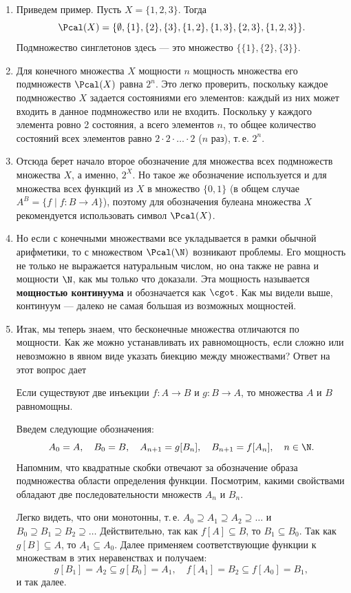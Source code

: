 \begin{enumerate}
\item Приведем пример. Пусть $X=\{1,2,3\}$. Тогда
$$
\Pcal(X) = \{\emptyset,\{1\},\{2\},\{3\},\{1,2\},\{1,3\},\{2,3\},\{1,2,3\}\}.
$$
Подмножество синглетонов здесь --- это множество $\{\{1\},\{2\},\{3\}\}$.

\item Для конечного множества $X$ мощности $n$ мощность множества его подмножеств $\Pcal(X)$ равна $2^n$. Это легко проверить, поскольку каждое подмножество $X$ задается состояниями его элементов: каждый из них может входить в данное подмножество или не входить. Поскольку у каждого элемента ровно 2 состояния, а всего элементов $n$, то общее количество состояний всех элементов равно $2\cdot 2\cdot\ldots\cdot 2$ ($n$ раз), т.\,е. $2^n$.
\item Отсюда берет начало второе обозначение для множества всех подмножеств множества $X$, а именно, $2^X$.
Но такое же обозначение используется и для множества всех функций из $X$ в множество $\{0,1\}$ (в общем случае $A^B=\{f\mid f:B\to A\}$), поэтому для обозначения булеана множества $X$ рекомендуется использовать символ $\Pcal(X)$.

\item Но если с конечными множествами все укладывается в рамки обычной арифметики, то с множеством $\Pcal(\N)$ возникают проблемы. Его мощность не только не выражается натуральным числом, но она также не равна и мощности $\N$, как мы только что доказали. Эта мощность называется \textbf{мощностью континуума} и обозначается как $\cgot$. Как мы видели выше, континуум --- далеко не самая большая из возможных мощностей.
\item Итак, мы теперь знаем, что бесконечные множества отличаются по мощности. Как же можно устанавливать их равномощность, если сложно или невозможно в явном виде указать биекцию между множествами? Ответ на этот вопрос дает
\begin{thrm}\label{KBS}
Если существуют две инъекции $f:A\to B$ и $g:B\to A$, то множества $A$ и $B$ равномощны.
\end{thrm}
\pf
Введем следующие обозначения:
$$
A_0=A,\quad B_0=B,\quad A_{n+1}=g[B_n],\quad B_{n+1}=f[A_n],\quad n\in\N.
$$
Напомним, что квадратные скобки отвечают за обозначение образа подмножества области определения функции. Посмотрим, какими свойствами обладают две последовательности множеств $A_n$ и $B_n$.

Легко видеть, что они монотонны, т.\,е. $A_0\supseteq A_1\supseteq A_2\supseteq\dots$ и $B_0\supseteq B_1\supseteq B_2\supseteq\dots$
Действительно, так как $f[A]\subseteq B$, то $B_1\subseteq B_0$. Так как $g[B]\subseteq A$, то $A_1\subseteq A_0$. Далее применяем соответствующие функции к множествам в этих неравенствах и получаем:
$$
g[B_1]=A_2\subseteq g[B_0]=A_1,\quad f[A_1]=B_2\subseteq f[A_0]=B_1,
$$
и так далее.


\end{enumerate}
